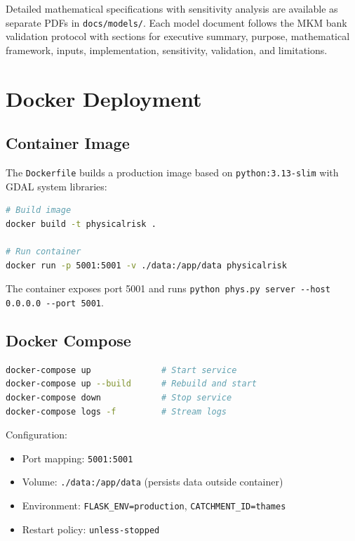 \documentclass[11pt,a4paper]{article}
\begin{document}
Detailed mathematical specifications with sensitivity analysis are available
as separate PDFs in \texttt{docs/models/}. Each model document follows the MKM
bank validation protocol with sections for executive summary, purpose, mathematical
framework, inputs, implementation, sensitivity, validation, and limitations.

\section{Docker Deployment}

\subsection{Container Image}

The \texttt{Dockerfile} builds a production image based on
\texttt{python:3.13-slim} with GDAL system libraries:

\begin{lstlisting}[language=bash,caption={Docker build and run}]
# Build image
docker build -t physicalrisk .

# Run container
docker run -p 5001:5001 -v ./data:/app/data physicalrisk
\end{lstlisting}

The container exposes port 5001 and runs
\texttt{python phys.py server -{}-host 0.0.0.0 -{}-port 5001}.

\subsection{Docker Compose}

\begin{lstlisting}[language=bash,caption={Docker Compose usage}]
docker-compose up              # Start service
docker-compose up --build      # Rebuild and start
docker-compose down            # Stop service
docker-compose logs -f         # Stream logs
\end{lstlisting}

Configuration:
\begin{itemize}[nosep]
    \item Port mapping: \texttt{5001:5001}
    \item Volume: \texttt{./data:/app/data} (persists data outside container)
    \item Environment: \texttt{FLASK\_ENV=production},
          \texttt{CATCHMENT\_ID=thames}
    \item Restart policy: \texttt{unless-stopped}
\end{itemize}
\end{document}
